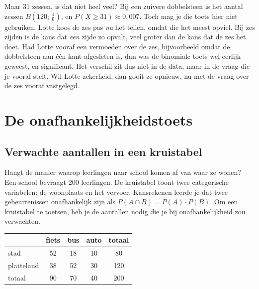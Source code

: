Maar 31 zessen, is dat niet heel veel? Bij een zuivere dobbelsteen is het aantal zessen $B(120;\, \frac16)$, en $P(X \geqslant 31) \approx 0{,}007$. Toch mag je die toets hier niet gebruiken. Lotte koos de zes pas \textit{na} het tellen, omdat die het meest opviel. Bij zes zijden is de kans dat \textit{een} zijde zo opvalt, veel groter dan de kans dat de zes het doet. Had Lotte vooraf een vermoeden over de zes, bijvoorbeeld omdat de dobbelsteen aan één kant afgesleten is, dan was de binomiale toets wel eerlijk geweest, en significant. Het verschil zit dus niet in de data, maar in de vraag die je vooraf stelt. Wil Lotte zekerheid, dan gooit ze opnieuw, nu met de vraag over de zes vooraf vastgelegd.

\section{De onafhankelijkheidstoets}

\subsection{Verwachte aantallen in een kruistabel}

Hangt de manier waarop leerlingen naar school komen af van waar ze wonen? Een school bevraagt 200 leerlingen. De kruistabel toont twee categorische variabelen: de woonplaats en het vervoer. Kansrekenen leerde je dat twee gebeurtenissen onafhankelijk zijn als $P(A \cap B) = P(A) \cdot P(B)$. Om een kruistabel te toetsen, heb je de aantallen nodig die je bij onafhankelijkheid zou verwachten.

\begin{center}\small\renewcommand{\arraystretch}{1.2}
\begin{tabular}{|l|c|c|c|c|}\hline
 & fiets & bus & auto & totaal \\\hline
stad & 52 & 18 & 10 & 80 \\\hline
platteland & 38 & 52 & 30 & 120 \\\hline
totaal & 90 & 70 & 40 & 200 \\\hline
\end{tabular}
\end{center}

